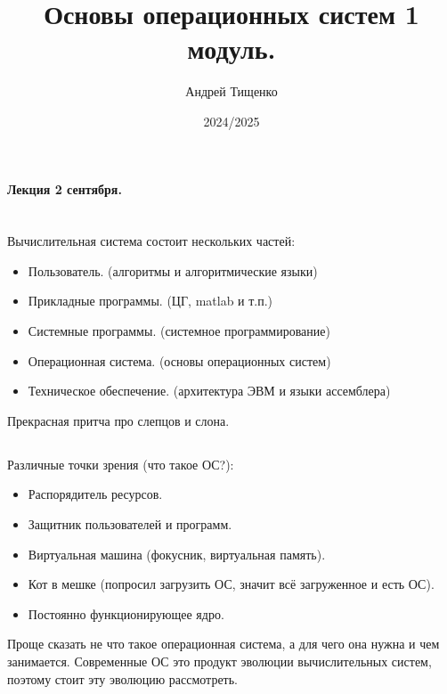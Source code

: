 \documentclass[12pt, a4paper]{article}
\title{Основы операционных систем 1 модуль.}
\author{Андрей Тищенко}
\date{2024/2025}
\begin{document}
    \maketitle
    \begin{center}
        \textbf{Лекция 2 сентября.}
    \end{center}
    \section{}
    Вычислительная система состоит нескольких частей:
    \begin{itemize}
        \item Пользователь. (алгоритмы и алгоритмические языки)
        \item Прикладные программы. (ЦГ, matlab и т.п.)
        \item Системные программы. (системное программирование)
        \item Операционная система. (основы операционных систем)
        \item Техническое обеспечение. (архитектура ЭВМ и языки ассемблера)
    \end{itemize}
    Прекрасная притча про слепцов и слона.
    \subsection{}
    Различные точки зрения (что такое ОС?):
    \begin{itemize}
        \item Распорядитель ресурсов.
        \item Защитник пользователей и программ.
        \item Виртуальная машина (фокусник, виртуальная память).
        \item Кот в мешке (попросил загрузить ОС, значит всё загруженное и есть ОС).
        \item Постоянно функционирующее ядро.
    \end{itemize}
    Проще сказать не что такое операционная система, а для чего она нужна и чем 
    занимается. Современные ОС это продукт эволюции вычислительных систем, поэтому 
    стоит эту эволюцию рассмотреть.
\end{document}
